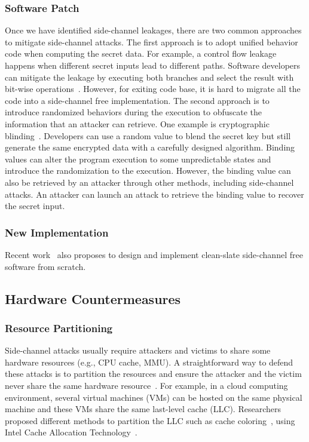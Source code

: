 \subsubsection*{Software Patch}
Once we have identified side-channel leakages, there are two common approaches to mitigate side-channel attacks. The first approach is to adopt unified behavior code when computing the secret data. For example, a control flow leakage happens when different secret inputs lead to different paths. Software developers can mitigate the leakage by executing both branches and select the result with bit-wise operations~\cite{Coppens:2009:PMT:1607723.1608124}. However, for exiting code base, it is hard to migrate all the code into a side-channel free implementation. The second approach is to introduce randomized behaviors during the execution to obfuscate the information that an attacker can retrieve. One example is cryptographic blinding~\cite{coron1999resistance}. Developers can use a random value to blend the secret key but still generate the same encrypted data with a carefully designed algorithm.  Binding values can alter the program execution to some unpredictable states and introduce the randomization to the execution. However, the binding value can also be retrieved by an attacker through other methods, including side-channel attacks. An attacker can launch an attack to retrieve the binding value to recover the secret input.

\subsubsection{New Implementation}
Recent work~\cite{bernstein2012security,libsodium} also proposes to design and implement clean-slate side-channel free software from scratch. 

\subsection{Hardware Countermeasures}
\subsubsection*{Resource Partitioning}
Side-channel attacks usually require attackers and victims to share some hardware resources (e.g., CPU cache, MMU). A straightforward way to defend these attacks is to partition the resources and ensure the attacker and the victim never share the same hardware resource~\cite{Page2005PartitionedCA,shi2011limiting,liu2016catalyst}. For example, in a cloud computing environment, several virtual machines (VMs) can be hosted on the same physical machine and these VMs share the same last-level cache (LLC). Researchers proposed different methods to partition the LLC such as cache coloring~\cite{shi2011limiting}, using Intel Cache Allocation Technology~\cite{liu2016catalyst}.
